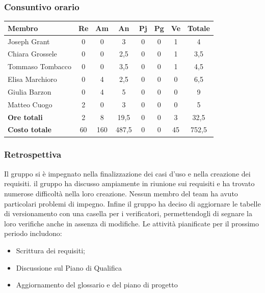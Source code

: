 \documentclass[11pt,a4paper]{article}
\begin{document}
\subsubsection{Consuntivo orario}
\begin{center}
    \begin{tabular}{|l|c|c|c|c|c|c|c|}
        \hline
        \textbf{Membro} & \textbf{Re} & \textbf{Am} & \textbf{An} & \textbf{Pj} & \textbf{Pg} & \textbf{Ve} & \textbf{Totale} \\
        \hline
        Joseph Grant & 0 & 0 & 3 & 0 & 0 & 1 & 4 \\
        \hline
        Chiara Grossele & 0 & 0 & 2,5 & 0 & 0 & 1 & 3,5 \\
        \hline
        Tommaso Tombacco & 0 & 0 & 3,5 & 0 & 0 & 1 & 4,5 \\
        \hline
        Elisa Marchioro & 0 & 4 & 2,5 & 0 & 0 & 0 & 6,5 \\
        \hline
        Giulia Barzon & 0 & 4 & 5 & 0 & 0 & 0 & 9 \\
        \hline
        Matteo Cuogo & 2 & 0 & 3 & 0 & 0 & 0 & 5 \\
        \hline
        \textbf{Ore totali} & 2 & 8 & 19,5 & 0 & 0 & 3 & 32,5 \\
        \hline
        \textbf{Costo totale} & 60 & 160 & 487,5 & 0 & 0 & 45 & 752,5 \\
        \hline
    \end{tabular}
\end{center}

\subsubsection{Retrospettiva}
Il gruppo si è impegnato nella finalizzazione dei casi d'uso e nella creazione dei requisiti. il gruppo ha discusso ampiamente in riunione sui requisiti e ha trovato numerose difficoltà nella loro creazione. Nessun membro del team ha avuto particolari problemi di impegno. Infine il gruppo ha deciso di aggiornare le tabelle di versionamento con una casella per i verificatori, permettendogli di segnare la loro verifiche anche in assenza di modifiche.
Le attività pianificate per il prossimo periodo includono:
\begin{itemize}
    \item Scrittura dei requisiti;
    \item Discussione sul Piano di Qualifica
    \item Aggiornamento del glossario e del piano di progetto
\end{itemize}
\end{document}
